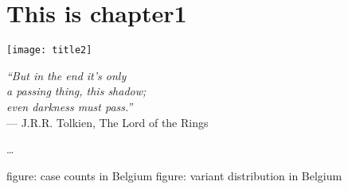 \chapter{This is chapter1}\label{ch:chapter1}

\begin{minipage}[b]{0.6\textwidth}
    \texttt{[image: title2]} %
  \end{minipage}
  \hfill
  \begin{minipage}[b]{0.35\textwidth}
    \footnotesize
    \begin{flushright}
      \textit{``But in the end it's only\\a passing thing, this shadow;\\even darkness must pass.''} \\
      --- J.R.R. Tolkien, The Lord of the Rings
    \end{flushright}
    \vspace{2cm}
  \end{minipage}
  
  \clearpage
\ldots


figure: case counts in Belgium
figure: variant distribution in Belgium



